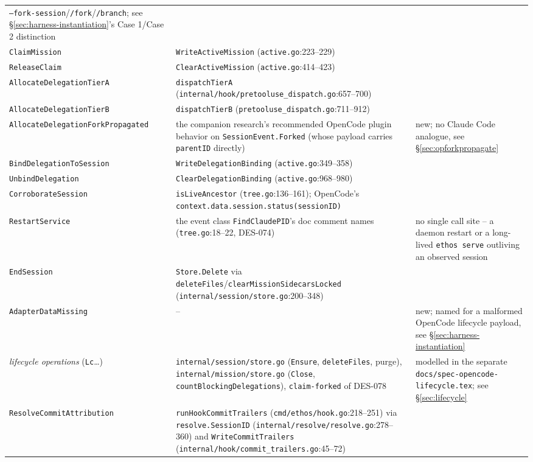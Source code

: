 \documentclass[a4paper,10pt,fleqn]{article}
\newcommand{\fpath}[1]{\texttt{#1}}
\newcommand{\field}[1]{\texttt{#1}}
\begin{document}
\begin{center}
\begin{tabularx}{\textwidth}{@{}llX@{}}
  \field{--fork-session}/\field{/fork}/\field{/branch}; see
  \S\ref{sec:harness-instantiation}'s Case 1/Case 2 distinction \\
\field{ClaimMission} & \field{WriteActiveMission}
  (\fpath{active.go}:223--229) & \\
\field{ReleaseClaim} & \field{ClearActiveMission}
  (\fpath{active.go}:414--423) & \\
\field{AllocateDelegationTierA} & \field{dispatchTierA}
  (\fpath{internal/hook/pretooluse\_dispatch.go}:657--700) & \\
\field{AllocateDelegationTierB} & \field{dispatchTierB}
  (\fpath{pretooluse\_dispatch.go}:711--912) & \\
\field{AllocateDelegationForkPropagated} & the companion research's
  recommended OpenCode plugin behavior on \field{SessionEvent.Forked}
  (whose payload carries \field{parentID} directly) & new; no Claude
  Code analogue, see \S\ref{sec:opforkpropagate} \\
\field{BindDelegationToSession} & \field{WriteDelegationBinding}
  (\fpath{active.go}:349--358) & \\
\field{UnbindDelegation} & \field{ClearDelegationBinding}
  (\fpath{active.go}:968--980) & \\
\field{CorroborateSession} & \field{isLiveAncestor}
  (\fpath{tree.go}:136--161); OpenCode's
  \field{context.data.session.status(sessionID)} & \\
\field{RestartService} & the event class \field{FindClaudePID}'s doc
  comment names (\fpath{tree.go}:18--22, DES-074) & no single
  call site -- a daemon restart or a long-lived \field{ethos serve}
  outliving an observed session \\
\field{EndSession} & \field{Store.Delete} via
  \field{deleteFiles}/\field{clearMissionSidecarsLocked}
  (\fpath{internal/session/store.go}:200--348) & \\
\field{AdapterDataMissing} & -- & new; named for a malformed OpenCode
  lifecycle payload, see \S\ref{sec:harness-instantiation} \\
\textit{lifecycle operations} (\field{Lc}\ldots) &
  \fpath{internal/session/store.go} (\field{Ensure}, \field{deleteFiles},
  purge), \fpath{internal/mission/store.go} (\field{Close},
  \field{countBlockingDelegations}), \field{claim-forked} of DES-078 &
  modelled in the separate \fpath{docs/spec-opencode-lifecycle.tex}; see
  \S\ref{sec:lifecycle} \\
\field{ResolveCommitAttribution} & \field{runHookCommitTrailers}
  (\fpath{cmd/ethos/hook.go}:218--251) via \field{resolve.SessionID}
  (\fpath{internal/resolve/resolve.go}:278--360) and
  \field{WriteCommitTrailers}
  (\fpath{internal/hook/commit\_trailers.go}:45--72) & \\
\bottomrule
\end{tabularx}
\end{center}
\end{document}

